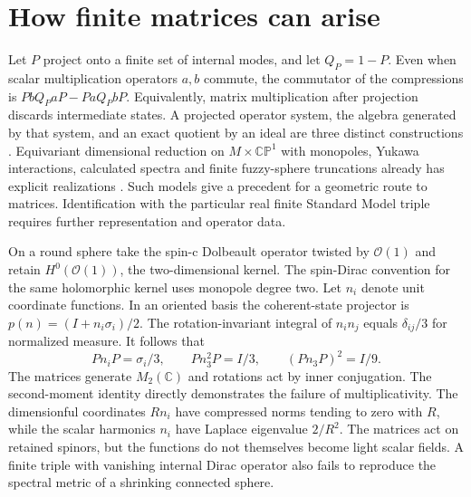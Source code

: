 \documentclass[11pt,oneside]{article}
\newcommand{\C}{\mathbb C}
\newcommand{\CP}{\mathbb{CP}}
\newcommand{\OO}{\mathcal O}
\begin{document}
\section{How finite matrices can arise}
Let \(P\) project onto a finite set of internal modes, and let \(Q_P=1-P\). Even when scalar multiplication operators \(a,b\) commute, the commutator of the compressions is \(PbQ_PaP-PaQ_PbP\). Equivalently, matrix multiplication after projection discards intermediate states. A projected operator system, the algebra generated by that system, and an exact quotient by an ideal are three distinct constructions \cite{trunc}. Equivariant dimensional reduction on \(M\times\CP^1\) with monopoles, Yukawa interactions, calculated spectra and finite fuzzy-sphere truncations already has explicit realizations \cite{dolan}. Such models give a precedent for a geometric route to matrices. Identification with the particular real finite Standard Model triple requires further representation and operator data.

On a round sphere take the spin-c Dolbeault operator twisted by \(\OO(1)\) and retain \(H^0(\OO(1))\), the two-dimensional kernel. The spin-Dirac convention for the same holomorphic kernel uses monopole degree two. Let \(n_i\) denote unit coordinate functions. In an oriented basis the coherent-state projector is \(p(n)=(I+n_i\sigma_i)/2\). The rotation-invariant integral of \(n_i n_j\) equals \(\delta_{ij}/3\) for normalized measure. It follows that
\[
 Pn_iP=\sigma_i/3,\qquad
 Pn_3^2P=I/3,\qquad (Pn_3P)^2=I/9 .
\]
The matrices generate \(M_2(\C)\) and rotations act by inner conjugation. The second-moment identity directly demonstrates the failure of multiplicativity. The dimensionful coordinates \(Rn_i\) have compressed norms tending to zero with \(R\), while the scalar harmonics \(n_i\) have Laplace eigenvalue \(2/R^2\). The matrices act on retained spinors, but the functions do not themselves become light scalar fields. A finite triple with vanishing internal Dirac operator also fails to reproduce the spectral metric of a shrinking connected sphere.
\end{document}
